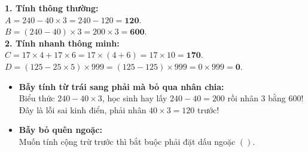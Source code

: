 \documentclass[11pt,a4paper]{article}
\begin{document}
\vspace{-2.5mm}
\noindent
\begin{minipage}[t]{0.49\textwidth}\vspace{0pt}
\begin{tcolorbox}[
  enhanced,
  colback=green!4!white,
  colframe=green!60!black,
  arc=2mm, boxrule=0.8pt,
  left=2mm, right=2mm, top=1.8mm, bottom=1.8mm,
  title={\footnotesize\bfseries\color{white}\faCheckCircle\ Ví dụ thực hành chuẩn mực}
]
{\footnotesize
\textbf{1. Tính thông thường:}\\
$A = 240 - 40 \times 3 = 240 - 120 = \mathbf{120}$.\\
$B = (240 - 40) \times 3 = 200 \times 3 = \mathbf{600}$.\\
\textbf{2. Tính nhanh thông minh:}\\
$C = 17 \times 4 + 17 \times 6 = 17 \times (4 + 6) = 17 \times 10 = \mathbf{170}$.\\
$D = (125 - 25 \times 5) \times 999 = (125 - 125) \times 999 = 0 \times 999 = \mathbf{0}$.
}
\end{tcolorbox}
\end{minipage}
\hfill
\begin{minipage}[t]{0.49\textwidth}\vspace{0pt}
\begin{tcolorbox}[
  enhanced,
  colback=red!4!white,
  colframe=red!70!black,
  arc=2mm, boxrule=0.8pt,
  left=2mm, right=2mm, top=1.8mm, bottom=1.8mm,
  title={\footnotesize\bfseries\color{white}\faExclamationTriangle\ Mẹo tránh bẫy trắc nghiệm}
]
{\footnotesize
\begin{itemize}\setlength{\itemsep}{1.5pt}\setlength{\leftskip}{-2.5mm}
  \item \textbf{Bẫy tính từ trái sang phải mà bỏ qua nhân chia:}\\
  Biểu thức $240 - 40 \times 3$, học sinh hay lấy $240 - 40 = 200$ rồi nhân $3$ bằng $600$! Đây là lỗi sai kinh điển, phải nhân $40 \times 3 = 120$ trước!
  \item \textbf{Bẫy bỏ quên ngoặc:}\\
  Muốn tính cộng trừ trước thì bắt buộc phải đặt dấu ngoặc $( )$.
\end{itemize}
}
\end{tcolorbox}
\end{minipage}
\end{document}
